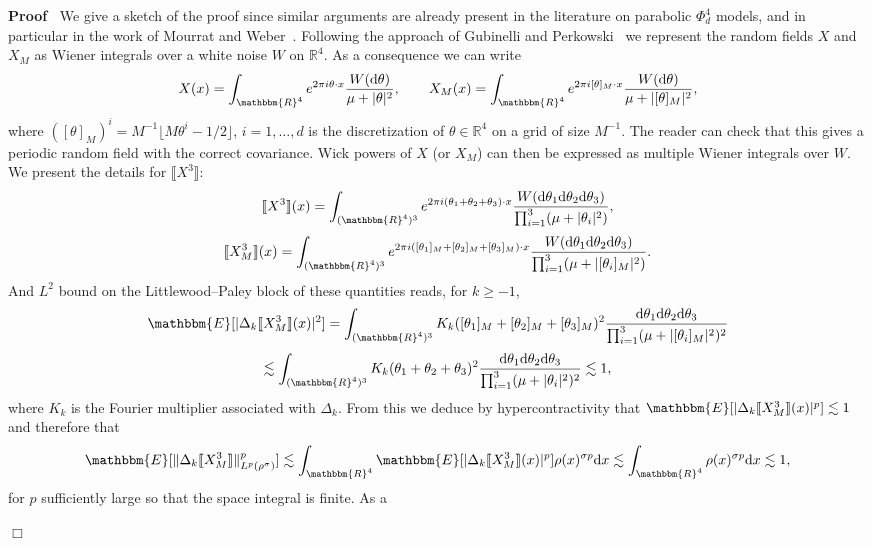 \documentclass[a4paper,11pt]{article}
\renewcommand{\geq}{\geqslant}
\newcommand{\mathd}{\mathrm{d}}
\newenvironment{proof}{\noindent\textbf{Proof\ }}{\hspace*{\fill}$\Box$\medskip}
\numberwithin{equation}{section}
\newcommand{\R}{\mathbb{R}}
\newcommand{\8}{\infty}
\begin{document}
 \begin{proof} We give a sketch of the proof since similar arguments are already present in the literature on parabolic $\Phi^4_d$ models, and in particular in the work of Mourrat and Weber~\cite{MW17}. Following the approach of Gubinelli and Perkowski~\cite{gubinelli_kpz_2017} we represent the random fields $X$ and $X_M$ as Wiener integrals over a white noise $W$ on $\R^4$. As a consequence we can write 
 \[ X (x) = \int_{\mathbbm{R}^4} e^{2 \pi i \theta \cdot x} \frac{W (\mathd
   \theta)}{\mu + | \theta |^2}, \qquad X_M (x) = \int_{\mathbbm{R}^4} e^{2
   \pi i [\theta]_M \cdot x} \frac{W (\mathd \theta)}{\mu + | [\theta]_M |^2},
\]
where $([\theta]_M)^i = M^{- 1} \lfloor M \theta^i - 1 / 2 \rfloor$, $i = 1,
\ldots, d$ is the discretization of $\theta\in\R^4$ on a grid of size $M^{-1}$. The reader can check that this gives a periodic random field with the correct covariance. Wick powers of $X$ (or $X_M$) can then be expressed as multiple Wiener integrals over $W$. We present the details for $\llbracket X^3 \rrbracket $:
\[ \llbracket X^3 \rrbracket (x) = \int_{(\mathbbm{R}^4)^3} e^{2 \pi i
   (\theta_1 + \theta_2 + \theta_3) \cdot x} \frac{W (\mathd \theta_1 \mathd
   \theta_2 \mathd \theta_3)}{\prod_{i = 1}^3 (\mu + | \theta_i |^2)}, \]
\[ \llbracket X^3_M \rrbracket (x) = \int_{(\mathbbm{R}^4)^3} e^{2 \pi i
   ([\theta_1]_M + [\theta_2]_M + [\theta_3]_M) \cdot x} \frac{W (\mathd
   \theta_1 \mathd \theta_2 \mathd \theta_3)}{\prod_{i = 1}^3 (\mu + |
   [\theta_i]_M |^2)} . \]
And $L^2$ bound on the Littlewood--Paley block of these quantities reads, for $k\geq -1$,
\[ \mathbbm{E} [| \Delta_k \llbracket X^3_M \rrbracket (x) |^2] =
   \int_{(\mathbbm{R}^4)^3} K_k ([\theta_1]_M + [\theta_2]_M +
   [\theta_3]_M)^2 \frac{\mathd \theta_1 \mathd \theta_2 \mathd
   \theta_3}{\prod_{i = 1}^3 (\mu + | [\theta_i]_M |^2)^2} \]
\[ \lesssim \int_{(\mathbbm{R}^4)^3} K_k (\theta_1 + \theta_2 + \theta_3)^2
   \frac{\mathd \theta_1 \mathd \theta_2 \mathd \theta_3}{\prod_{i = 1}^3 (\mu
   + | \theta_i |^2)^2} \lesssim 1, \]
where $K_{k}$ is the Fourier multiplier associated with $\Delta_k$. 
From this we deduce by hypercontractivity that $\mathbbm{E} [| \Delta_k
\llbracket X^3_M \rrbracket (x) |^p] \lesssim 1$ and therefore that
\[ \mathbbm{E} [\| \Delta_k \llbracket X^3_M \rrbracket \|_{L^p
   (\rho^{\sigma})}^p] \lesssim \int_{\mathbbm{R}^4} \mathbbm{E} [| \Delta_k
   \llbracket X^3_M \rrbracket (x) |^p] \rho (x)^{\sigma p} \mathd x \lesssim
   \int_{\mathbbm{R}^4} \rho (x)^{\sigma p} \mathd x \lesssim 1, \]
for $p$ sufficiently large so that the space integral is finite. As a

\end{proof}
\end{document}

